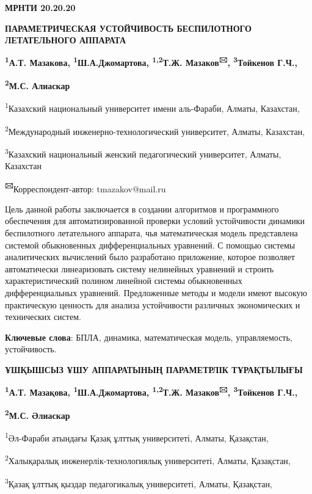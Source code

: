 \newpage
{\bfseries МРНТИ 20.20.20}

{\bfseries ПАРАМЕТРИЧЕСКАЯ УСТОЙЧИВОСТЬ БЕСПИЛОТНОГО ЛЕТАТЕЛЬНОГО АППАРАТА}

{\bfseries \textsuperscript{1}А.Т. Мазакова,
\textsuperscript{1}Ш.А.Джомартова, \textsuperscript{1,2}Т.Ж.
Мазаков\textsuperscript{🖂}, \textsuperscript{3}Тойкенов Г.Ч.,}

{\bfseries \textsuperscript{2}М.С. Алиаскар}

\textsuperscript{1}Казахский национальный университет имени аль-Фараби,
Алматы, Казахстан,

\textsuperscript{2}Международный инженерно-технологический университет,
Алматы, Казахстан,

\textsuperscript{3}Казахский национальный женский педагогический
университет, Алматы, Казахстан

{\bfseries \textsuperscript{🖂}}Корреспондент-автор: tmazakov@mail.ru

Цель данной работы заключается в создании алгоритмов и программного
обеспечения для автоматизированной проверки условий устойчивости
динамики беспилотного летательного аппарата, чья математическая модель
представлена системой обыкновенных дифференциальных уравнений. С помощью
системы аналитических вычислений было разработано приложение, которое
позволяет автоматически линеаризовать систему нелинейных уравнений и
строить характеристический полином линейной системы обыкновенных
дифференциальных уравнений. Предложенные методы и модели имеют высокую
практическую ценность для анализа устойчивости различных экономических и
технических систем.

{\bfseries Ключевые слова}: БПЛА, динамика, математическая модель,
управляемость, устойчивость.

{\bfseries ҰШҚЫШСЫЗ ҰШУ АППАРАТЫНЫҢ ПАРАМЕТРЛІК ТҰРАҚТЫЛЫҒЫ}

{\bfseries \textsuperscript{1}А.Т. Мазақова,
\textsuperscript{1}Ш.А.Джомартова, \textsuperscript{1,2}Т.Ж.
Мазаков\textsuperscript{🖂}, \textsuperscript{3}Тойкенов Г.Ч.,}

{\bfseries \textsuperscript{2}М.С. Әлиаскар}

\textsuperscript{1}Әл-Фараби атындағы Қазақ ұлттық университеті, Алматы,
Қазақстан,

\textsuperscript{2}Халықаралық инженерлік-технологиялық университеті,
Алматы, Қазақстан,

\textsuperscript{3}Қазақ ұлттық қыздар педагогикалық университеті,
Алматы, Қазақстан,


